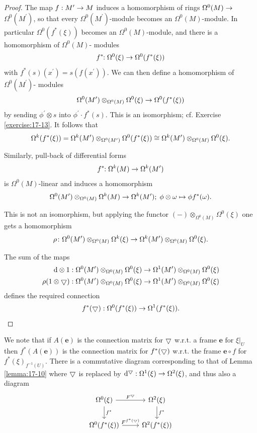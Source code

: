 \begin{proof}
  The map $f:{M}^{\prime } \rightarrow  M$ induces a homomorphism of rings $\Omega^0(M)  \rightarrow$  $\Omega^0( {M}^{\prime })$, 
  so that every $\Omega^0( {M}^{\prime })$-module becomes an $\Omega^0(M)$-module. In particular $\Omega^0( {f^*(\xi) })$ 
  becomes an $\Omega^0(M)$-module, and there is a homomorphism of $\Omega^0(M)$- modules
  \[
    f^*\!\!:\Omega^0(\xi)  \rightarrow  \Omega^0( {f^*(\xi) })
  \]
  with $f^*(s) ( x^{\prime })  = s( {f( x^{\prime }) })$. We can then define a homomorphism 
  of $\Omega^0( {M}^{\prime })$- modules
  \[
    \Omega^0( {M}^{\prime }) \otimes_{\Omega^0(M) }\Omega^0(\xi)  \rightarrow  \Omega^0( {f^*(\xi) })
  \]
  by sending ${\phi }^{\prime } \otimes  s$ into ${\phi }^{\prime } \cdot  f^*(s)$. This is an isomorphism; 
  cf. Exercise \ref{exercise:17-13}. It follows that
  \[
    \Omega^{k}( {f^*(\xi) }) 
    = \Omega^{k}( {M}^{\prime }) \otimes_{\Omega^0( {M}^{\prime }) }\Omega^0( {f^*(\xi) })  
    \cong \Omega^{k}( {M}^{\prime }) \otimes_{\Omega^0(M) }\Omega^0(\xi).
  \]

  Similarly, pull-back of differential forms
  \[
    f^*\!\!:\Omega^{k}(M)  \rightarrow  \Omega^{k}( {M}^{\prime })
  \]
  is $\Omega^0(M)$-linear and induces a homomorphism
  \[
    \Omega^0( {M}^{\prime }) \otimes_{\Omega^0(M) }\Omega^{k}(M)  
    \rightarrow 
    \Omega^{k}( {M}^{\prime });\;\phi  \otimes  \omega  \mapsto  \phi f^*( \omega ).
  \]

  This is not an isomorphism, but applying the functor $(-) \otimes_{\Omega^0(M) }\Omega^0(\xi)$ one gets a homomorphism
  \[
    \rho\colon\Omega^0( {M}^{\prime }) \otimes_{\Omega^0(M) }\Omega^{k}(\xi)  
    \rightarrow
    \Omega^{k}( {M}^{\prime }) \otimes_{\Omega^0(M) }\Omega^0(\xi).
  \]

  The sum of the maps
  \begin{align*}
    \dd \otimes  1:\Omega^0( {M}^{\prime }) \otimes_{\Omega^0(M) }\Omega^0(\xi)  
      & \ra  \Omega^1( {M}^{\prime }) \otimes_{\Omega^0(M) }\Omega^0(\xi) \\
    \rho ( {1 \otimes  \btd }) :\Omega^0( {M}^{\prime }) \otimes_{\Omega^0(M) }\Omega^0(\xi)  
      & \ra  \Omega^1( {M}^{\prime }) \otimes_{\Omega^0(M) }\Omega^0(\xi)
  \end{align*}
  defines the required connection
  \[
    f^*( \bigtriangledown ) :\Omega^0( {f^*(\xi) })  \rightarrow  \Omega^1( {f^*(\xi) }).
  \]
\end{proof} 

We note that if $A( \mathbf{e})$ is the connection matrix for $\bigtriangledown$ w.r.t. 
a frame ${\left. \mathbf{e}\text{ for }\xi \right| }_{U}$ then $f^*( {A( \mathbf{e}) })$ is 
the connection matrix for $f^*( \bigtriangledown )$ w.r.t. the frame 
$\mathbf{e} \circ  f$ for $f^*{(\xi) }_{{f}^{-1}( U) }$. There is a commutative diagram corresponding
to that of Lemma \ref{lemma:17-10} where $\bigtriangledown$ is replaced 
by $\dd^\btd:\Omega^1(\xi) \ra  \Omega^{2}(\xi)$, and thus also a diagram
\[\begin{tikzcd}
  \Omega^0(\xi) \dar{f^*}\rar{F^\btd} & \Omega^2(\xi) \dar{f^*} \\
  \Omega^0(f^*(\xi)) \rar{F^{f^*(\btd)}} & \Omega^2( {f^*(\xi) })
\end{tikzcd}\]

